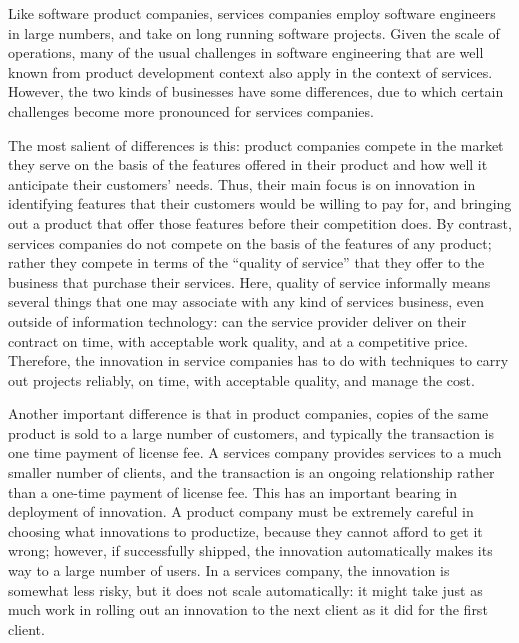 Like software product companies, services companies employ software engineers in large numbers, and take on long running software projects. Given the scale of operations, many of the usual challenges in software engineering that are well known from product development context also apply in the context of services.  However, the two kinds of businesses have some differences, due to which certain challenges become more pronounced for services companies. 

The most salient of differences is this: product companies compete in the market they serve on the basis of the features offered in their product and how well it anticipate their customers' needs. Thus, their main focus is on innovation in identifying features that their customers would be willing to pay for, and bringing out a product that offer those features before their competition does. By contrast, services companies do not compete on the basis of the features of any product; rather they compete in terms of the ``quality of service'' that they offer to the business that purchase their services. Here, quality of service informally means several things that one may associate with any kind of services business, even outside of information technology: can the service provider deliver on their contract on time, with acceptable work quality, and at a competitive price.  Therefore, the innovation in service companies has to do with techniques to carry out projects reliably, on time, with acceptable quality, and manage the cost.

Another important difference is that in product companies, copies of the same product is sold to a large number of customers, and typically the transaction is one time payment of license fee.  A services company provides services to a much smaller number of clients, and the transaction is an ongoing relationship rather than a one-time payment of license fee. This has an important bearing in deployment of innovation.  A product company must be extremely careful in choosing what innovations to productize, because they cannot afford to get it wrong; however, if successfully shipped, the innovation automatically makes its way to a large number of users.  In a services company, the innovation is somewhat less risky, but it does not scale automatically: it might take just as much work in rolling out an innovation to the next client as it did for the first client.


